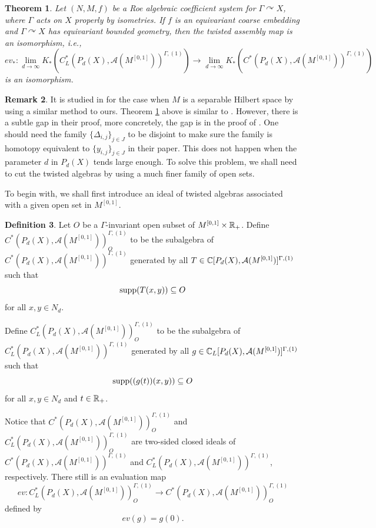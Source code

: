 \documentclass[11pt]{article}
\theoremstyle{definition}
\newtheorem{Def}{Definition}[section]
\newtheorem{Rem}[Def]{Remark}
\theoremstyle{plain}
\newtheorem{Thm}[Def]{Theorem}
\def\A{\mathcal A}\def\C{\mathcal C}\def\B{\mathcal B}\def\E{\mathcal E}\def\O{\mathcal O}\def\h{\mathfrak h}\def\K{\mathcal K}\def\F{\mathcal F}\def\P{\mathcal P}\def\L{\mathcal L}\def\R{\mathcal R}\def\Q{\mathcal Q}\def\H{\mathcal H}\def\S{\mathcal S}\def\N{\mathcal N}\def\U{\mathcal U}\def\V{\mathcal V}
\def\supp{\textup{supp}}
\def\Ga{\Gamma}
\def\car{\curvearrowright}
\begin{document}
\begin{Thm}\label{twist assembly}
Let $(N, M,f)$ be a Roe algebraic coefficient system for $\Ga\car X$, where $\Ga$ acts on $X$ properly by isometries. If $f$ is an equivariant coarse embedding and $\Ga\car X$ has equivariant bounded geometry, then the twisted assembly map is an isomorphism, i.e.,
$$ev_*:\lim_{d\to\infty}K_*(C^*_L(P_d(X),\A(M^{[0,1]}))^{\Ga,(1)})\to\lim_{d\to\infty}K_*(C^*(P_d(X),\A(M^{[0,1]}))^{\Ga,(1)})$$
is an isomorphism.
\end{Thm}

\begin{Rem}\label{difference with FW}
It is studied in \cite{FW2016} for the case when $M$ is a separable Hilbert space by using a similar method to ours. Theorem \ref{twist assembly} above is similar to \cite[Theorem 4.11]{FW2016}. However, there is a subtle gap in their proof, more concretely, the gap is in the proof of \cite[Lemma 4.20]{FW2016}. One should need the family $\{\Delta_{i,j}\}_{j\in J}$ to be disjoint to make sure the family is homotopy equivalent to $\{y_{i,j}\}_{j\in J}$ in their paper. This does not happen when the parameter $d$ in $P_d(X)$ tends large enough. To solve this problem, we shall need to cut the twisted algebras by using a much finer family of open sets.
\end{Rem}

To begin with, we shall first introduce an ideal of twisted algebras associated with a given open set in $M^{[0,1]}$.

\begin{Def}
Let $O$ be a $\Ga$-invariant open subset of $M^{[0,1]}\times\mathbb R_+$. Define $C^*(P_d(X),\A(M^{[0,1]}))^{\Ga,(1)}_O$ to be the subalgebra of $C^*(P_d(X),\A(M^{[0,1]}))^{\Ga,(1)}$ generated by all $T\in\IC[P_d(X),\A(M^{[0,1]})]^{\Ga,(1)}$ such that
$$\supp(T(x,y))\subseteq O$$
for all $x,y\in N_d$.

Define $C^*_L(P_d(X),\A(M^{[0,1]}))^{\Ga,(1)}_O$ to be the subalgebra of $C^*_L(P_d(X),\A(M^{[0,1]}))^{\Ga,(1)}$ generated by all $g\in\IC_L[P_d(X),\A(M^{[0,1]})]^{\Ga,(1)}$ such that
$$\supp((g(t))(x,y))\subseteq O$$
for all $x,y\in N_d$ and $t\in\mathbb R_+$.
\end{Def}

Notice that $C^*(P_d(X),\A(M^{[0,1]}))^{\Ga,(1)}_O$ and $C^*_L(P_d(X),\A(M^{[0,1]}))^{\Ga,(1)}_O$ are two-sided closed ideals of $C^*(P_d(X),\A(M^{[0,1]}))^{\Ga,(1)}$ and $C^*_L(P_d(X),\A(M^{[0,1]}))^{\Ga,(1)}$, respectively. There still is an evaluation map
$$ev:C^*_L(P_d(X),\A(M^{[0,1]}))^{\Ga,(1)}_O\to C^*(P_d(X),\A(M^{[0,1]}))^{\Ga,(1)}_O$$
defined by
$$ev(g)=g(0).$$
\end{document}
